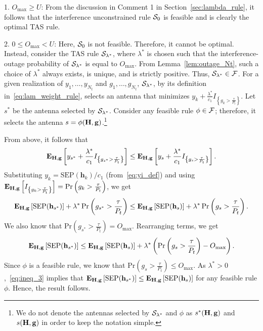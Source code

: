 \documentclass[12pt,draftcls,peerreview,onecolumn]{IEEEtran}
\newcommand{\brac}[1]{\left({#1}\right)}
\newcommand{\cbrac}[1]{\left\{{#1}\right\}}
\newcommand{\indic}[1]{I_{\cbrac{#1}}}
\newcommand{\mtx}[1]{{\bf #1}} %
\newcommand{\explow}[2]{{\bf{E}}_{#1}\left[{#2}\right]}
\newcommand{\prob}[1]{\text{Pr}\brac{#1}}
\newcommand{\SEP}{\text{SEP}}
\newcommand{\lam}{\lambda}
\newcommand{\lamstar}{\lam^{*}}
\newcommand{\sstar}{s^{*}}
\newcommand{\F}{\cal{F}}
\newcommand{\Nt}{{N_t}}
\newcommand{\Pt}{{P_t}}
\newcommand{\such}{h}
\newcommand{\puch}{g}
\newcommand{\gk}[1]{{\puch_{#1}}}
\newcommand{\g}{\mathbf{\puch}}
\newcommand{\outmax}{O_{\text{max}}}
\newcommand{\itau}{\tau}
\newcommand{\cone}{c_{1}}
\newcommand{\taubypt}{\frac{\itau}{\Pt}}
\newcommand{\gkgrtaubypt}[1]{{\gk{#1}}>\taubypt}
\newcommand{\gindic}[1]{\indic{\gkgrtaubypt{#1}}}
\newcommand{\yk}[1]{y_{#1}}
\newcommand{\un}{U}
\newcommand{\asrule}{\phi}
\newcommand{\Hmx}{\mtx{H}}
\newcommand{\caluncons}{{\cal S_{\text{0}}}}
\newcommand{\callamstarrule}{\cal S_{\lam^{*}}}
\newcommand{\hs}{\mathbf{\such}_{s}}
\newcommand{\bhk}[1]{\mathbf{\such}_{#1}}
\newcommand{\hsstar}{\mathbf{\such}_{s^{*}}}
\begin{document}
{ 1. $\outmax\geq\un$:} From the discussion in Comment 1 in Section~\ref{sec:lambda_rule}, it follows that the interference unconstrained rule $\caluncons$ is feasible and is clearly the optimal TAS rule. 

{2. $0\leq\outmax<\un$:} Here, $\caluncons$ is not feasible. Therefore, it cannot be optimal.  Instead, consider the TAS rule $\callamstarrule$, where $\lamstar$ is chosen such that the interference-outage probability of $\callamstarrule$ is equal to $\outmax$. From Lemma~\ref{lem:outage_Nt}, such a choice of $\lamstar$ always exists, is unique, and is strictly positive. Thus, $\callamstarrule\in\F$. For a given realization of $\yk{1},\ldots,\yk{\Nt}$ and $\gk{1},\ldots,\gk{\Nt}$,   $\callamstarrule$, by its definition in~\eqref{eq:lam_weight_rule}, selects an antenna that minimizes $\yk{k} + \frac{\lamstar}{\cone}\gindic{k}$. Let $\sstar$ be the antenna selected by $\callamstarrule$. Consider any feasible rule $\asrule\in\F$; therefore, it selects the antenna  $s=\phi(\Hmx,\g)$.\footnote{We do not denote the antennas selected by $\callamstarrule$ and $\phi$ as $s^*(\Hmx,\g)$ and $s(\Hmx,\g)$ in order to keep the notation simple.} 

From above, it follows that   
\begin{equation}
\label{eq:opt_rul_1}  
   \explow{\Hmx,\g}{\yk{{\sstar}} + \frac{\lamstar}{\cone}\gindic{{\sstar}}} \leq  \explow{\Hmx,\g}{\yk{{s}} + \frac{\lamstar}{\cone}\gindic{{s}}}.
\end{equation}
%
Substituting $\yk{k}={\SEP(\bhk{k})}/{\cone}$ (from~\eqref{eq:yi_def}) and using $\explow{\Hmx,\g}{\gindic{k}}=\prob{\gk{k}>\taubypt}$, we get
%
\begin{equation}
\label{eq:opt_rul_2}
   \explow{\Hmx,\g}{\SEP(\hsstar)} + \lamstar \, \prob{\gk{\sstar}>\taubypt} \leq  \explow{\Hmx,\g}{\SEP(\hs)} + \lamstar \, \prob{\gk{s}>\taubypt}.
\end{equation}
%
We also know that $\prob{\gk{\sstar}>\taubypt}=\outmax$. Rearranging terms, we get
%
\begin{equation}
\label{eq:ineq_3}
\explow{\Hmx,\g}{\SEP(\hsstar)} \leq \explow{\Hmx,\g}{\SEP(\hs)} + \lamstar \left( \prob{\gk{s}>\taubypt} -  \outmax \right).
\end{equation}
%
Since $\phi$ is a feasible rule, we know that $\prob{\gkgrtaubypt{s}}\leq \outmax$. As $\lamstar>0$,~\eqref{eq:ineq_3} implies that $\explow{\Hmx,\g}{\SEP(\hsstar)} \leq \explow{\Hmx,\g}{\SEP(\hs)}$ for any feasible rule $\phi$. Hence, the result follows. %
\end{document}
